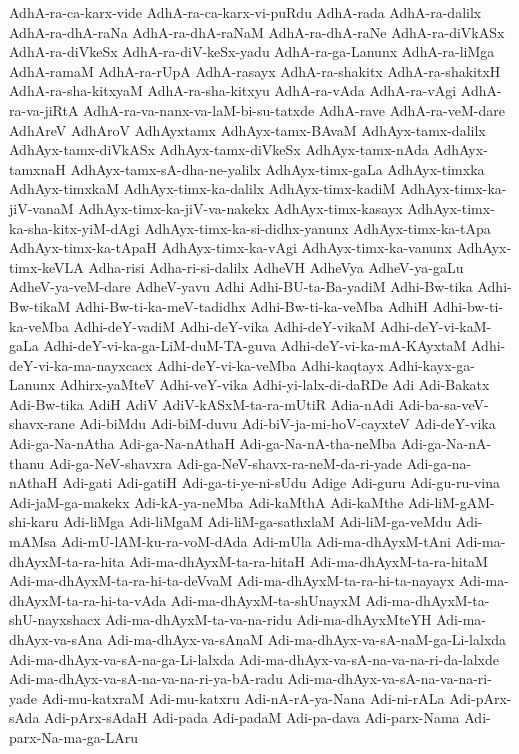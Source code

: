 {AdhA-ra-ca-karx-vide
AdhA-ra-ca-karx-vi-puRdu
AdhA-rada
AdhA-ra-dalilx
AdhA-ra-dhA-raNa
AdhA-ra-dhA-raNaM
AdhA-ra-dhA-raNe
AdhA-ra-diVkASx
AdhA-ra-diVkeSx
AdhA-ra-diV-keSx-yadu
AdhA-ra-ga-Lanunx
AdhA-ra-liMga
AdhA-ramaM
AdhA-ra-rUpA
AdhA-rasayx
AdhA-ra-shakitx
AdhA-ra-shakitxH
AdhA-ra-sha-kitxyaM
AdhA-ra-sha-kitxyu
AdhA-ra-vAda
AdhA-ra-vAgi
AdhA-ra-va-jiRtA
AdhA-ra-va-nanx-va-laM-bi-su-tatxde
AdhA-rave
AdhA-ra-veM-dare
AdhAreV
AdhAroV
AdhAyxtamx
AdhAyx-tamx-BAvaM
AdhAyx-tamx-dalilx
AdhAyx-tamx-diVkASx
AdhAyx-tamx-diVkeSx
AdhAyx-tamx-nAda
AdhAyx-tamxnaH
AdhAyx-tamx-sA-dha-ne-yalilx
AdhAyx-timx-gaLa
AdhAyx-timxka
AdhAyx-timxkaM
AdhAyx-timx-ka-dalilx
AdhAyx-timx-kadiM
AdhAyx-timx-ka-jiV-vanaM
AdhAyx-timx-ka-jiV-va-nakekx
AdhAyx-timx-kasayx
AdhAyx-timx-ka-sha-kitx-yiM-dAgi
AdhAyx-timx-ka-si-didhx-yanunx
AdhAyx-timx-ka-tApa
AdhAyx-timx-ka-tApaH
AdhAyx-timx-ka-vAgi
AdhAyx-timx-ka-vanunx
AdhAyx-timx-keVLA
Adha-risi
Adha-ri-si-dalilx
AdheVH
AdheVya
AdheV-ya-gaLu
AdheV-ya-veM-dare
AdheV-yavu
Adhi
Adhi-BU-ta-Ba-yadiM
Adhi-Bw-tika
Adhi-Bw-tikaM
Adhi-Bw-ti-ka-meV-tadidhx
Adhi-Bw-ti-ka-veMba
AdhiH
Adhi-bw-ti-ka-veMba
Adhi-deY-vadiM
Adhi-deY-vika
Adhi-deY-vikaM
Adhi-deY-vi-kaM-gaLa
Adhi-deY-vi-ka-ga-LiM-duM-TA-guva
Adhi-deY-vi-ka-mA-KAyxtaM
Adhi-deY-vi-ka-ma-nayxcacx
Adhi-deY-vi-ka-veMba
Adhi-kaqtayx
Adhi-kayx-ga-Lanunx
Adhirx-yaMteV
Adhi-veY-vika
Adhi-yi-lalx-di-daRDe
Adi
Adi-Bakatx
Adi-Bw-tika
AdiH
AdiV
AdiV-kASxM-ta-ra-mUtiR
Adia-nAdi
Adi-ba-sa-veV-shavx-rane
Adi-biMdu
Adi-biM-duvu
Adi-biV-ja-mi-hoV-cayxteV
Adi-deY-vika
Adi-ga-Na-nAtha
Adi-ga-Na-nAthaH
Adi-ga-Na-nA-tha-neMba
Adi-ga-Na-nA-thanu
Adi-ga-NeV-shavxra
Adi-ga-NeV-shavx-ra-neM-da-ri-yade
Adi-ga-na-nAthaH
Adi-gati
Adi-gatiH
Adi-ga-ti-ye-ni-sUdu
Adige
Adi-guru
Adi-gu-ru-vina
Adi-jaM-ga-makekx
Adi-kA-ya-neMba
Adi-kaMthA
Adi-kaMthe
Adi-liM-gAM-shi-karu
Adi-liMga
Adi-liMgaM
Adi-liM-ga-sathxlaM
Adi-liM-ga-veMdu
Adi-mAMsa
Adi-mU-lAM-ku-ra-voM-dAda
Adi-mUla
Adi-ma-dhAyxM-tAni
Adi-ma-dhAyxM-ta-ra-hita
Adi-ma-dhAyxM-ta-ra-hitaH
Adi-ma-dhAyxM-ta-ra-hitaM
Adi-ma-dhAyxM-ta-ra-hi-ta-deVvaM
Adi-ma-dhAyxM-ta-ra-hi-ta-nayayx
Adi-ma-dhAyxM-ta-ra-hi-ta-vAda
Adi-ma-dhAyxM-ta-shUnayxM
Adi-ma-dhAyxM-ta-shU-nayxshacx
Adi-ma-dhAyxM-ta-va-na-ridu
Adi-ma-dhAyxMteYH
Adi-ma-dhAyx-va-sAna
Adi-ma-dhAyx-va-sAnaM
Adi-ma-dhAyx-va-sA-naM-ga-Li-lalxda
Adi-ma-dhAyx-va-sA-na-ga-Li-lalxda
Adi-ma-dhAyx-va-sA-na-va-na-ri-da-lalxde
Adi-ma-dhAyx-va-sA-na-va-na-ri-ya-bA-radu
Adi-ma-dhAyx-va-sA-na-va-na-ri-yade
Adi-mu-katxraM
Adi-mu-katxru
Adi-nA-rA-ya-Nana
Adi-ni-rALa
Adi-pArx-sAda
Adi-pArx-sAdaH
Adi-pada
Adi-padaM
Adi-pa-dava
Adi-parx-Nama
Adi-parx-Na-ma-ga-LAru
}
